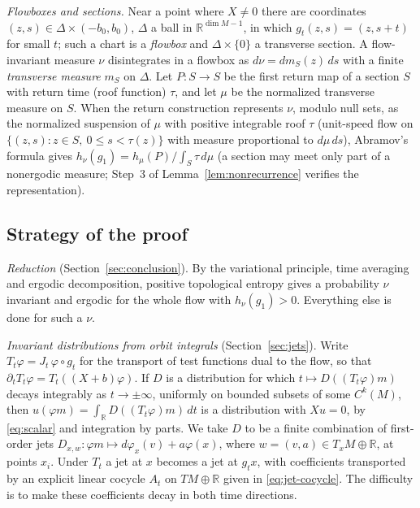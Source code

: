 \documentclass[11pt]{article}
\theoremstyle{remark}
\newcommand{\R}{\mathbb R}
\begin{document}
\emph{Flowboxes and sections.}  Near a point where \(X\ne0\) there
are coordinates \((z,s)\in \Delta\times(-b_0,b_0)\), \(\Delta\) a ball in
\(\R^{\dim M-1}\), in which \(g_t(z,s)=(z,s+t)\) for small \(t\); such
a chart is a \emph{flowbox} and \(\Delta\times\{0\}\) a transverse
section.  A flow-invariant measure \(\nu\) disintegrates in a flowbox
as \(d\nu=dm_S(z)\,ds\) with a finite \emph{transverse measure}
\(m_S\) on \(\Delta\).  Let \(P:S\to S\) be the first return map of a
section \(S\) with return time (roof function) \(\tau\), and let
\(\mu\) be the normalized transverse measure on \(S\).  When the
return construction represents \(\nu\), modulo null sets, as the
normalized suspension of \(\mu\) with positive integrable roof
\(\tau\) (unit-speed flow on \(\{(z,s):z\in S,\ 0\le s<\tau(z)\}\)
with measure proportional to \(d\mu\,ds\)), Abramov's formula
\cite{Abramov1959} gives
\(h_\nu(g_1)=h_\mu(P)/\int_S\tau\,d\mu\) (a section may meet only part
of a nonergodic measure; Step~3 of Lemma~\ref{lem:nonrecurrence}
verifies the representation).

\subsection{Strategy of the proof}
\label{sec:strategy}

\emph{Reduction} (Section~\ref{sec:conclusion}).
By the variational principle, time averaging and ergodic
decomposition, positive topological entropy gives a probability
\(\nu\) invariant and ergodic for the whole flow with
\(h_\nu(g_1)>0\).  Everything else is done for such a \(\nu\).

\emph{Invariant distributions from orbit integrals}
(Section~\ref{sec:jets}).  Write
\(T_t\varphi=J_t\,\varphi\circ g_t\) for the transport of test
functions dual to the flow, so that \(\partial_tT_t\varphi=T_t((X+b)\varphi)\).
If \(D\) is a distribution for which
\(t\mapsto D((T_t\varphi)m)\) decays integrably as \(t\to\pm\infty\),
uniformly on bounded subsets of some \(C^k(M)\), then
\(u(\varphi m)=\int_\R D((T_t\varphi)m)\,dt\) is a distribution with
\(Xu=0\), by \eqref{eq:scalar} and integration by parts.
We take \(D\) to be a finite combination of first-order jets
\(D_{x,w}:\varphi m\mapsto d\varphi_x(v)+a\varphi(x)\), where
\(w=(v,a)\in T_xM\oplus\R\), at points \(x_i\).
Under \(T_t\) a jet at \(x\) becomes a jet at \(g_tx\), with
coefficients transported by an explicit linear cocycle \(A_t\) on
\(TM\oplus\R\) given in \eqref{eq:jet-cocycle}.  The difficulty is
to make these coefficients decay in both time directions.
\end{document}
